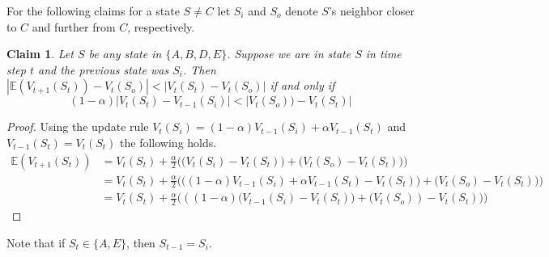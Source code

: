 \documentclass[12pt,a4paper]{article}
\newtheorem{claim}{Claim}
\begin{document}
\begin{enumerate}
For the following claims for a state $S \neq C$ let $S_i$ and $S_o$ denote $S$'s
neighbor closer to $C$ and further from $C$, respectively.

\begin{claim}
  Let $S$ be any state in $\{A, B, D, E\}$. Suppose we are in state $S$ in
  time step $t$ and the previous state was $S_i$. Then
  $|\mathbb{E}(V_{t + 1}(S_t)) - V_{t}(S_o)| < |V_t(S_t) - V_{t}(S_o)|$ if and only if
  \[
  (1 - \alpha) |V_t(S_t) - V_{t - 1} (S_i)| < |V_t(S_o)) - V_t(S_t)|
  \]
\end{claim}
\begin{proof}
  Using the update rule $ V_t(S_i) = (1 - \alpha) V_{t - 1}(S_i) + \alpha V_{t - 1}(S_t)$
  and $V_{t - 1}(S_t) = V_t(S_t)$ the following holds.
  \begin{align*}
  \mathbb{E}(V_{t + 1}(S_t))
  & = V_t(S_t) + \frac{\alpha}{2} \Big(\big(V_t(S_i) - V_t(S_t)\big) + \big(V_t(S_o) - V_t(S_t)\big)\Big)\\
  & = V_t(S_t) + \frac{\alpha}{2} \Big(\big((1 - \alpha) V_{t - 1}(S_i) +
  \alpha V_{t - 1}(S_t) - V_t(S_t)\big) + \big(V_t(S_o) - V_t(S_t)\big)\Big)\\
  & = V_t(S_t) + \frac{\alpha}{2} \Big(((1 - \alpha) \big(V_{t - 1}(S_i) - V_t(S_t)\big)
  + \big(V_t(S_o)) - V_t(S_t)\big)\Big)
  \end{align*}
\end{proof}

Note that if $S_t \in \{A, E\}$, then $S_{t - 1} = S_i$.


\end{enumerate}
\end{document}
